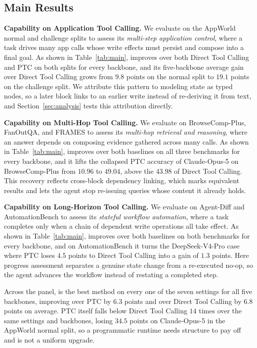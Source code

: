\subsection{Main Results}

\textbf{Capability on Application Tool Calling.}\quad
We evaluate \method on the AppWorld normal and challenge splits to assess its \emph{multi-step application control}, where a task drives many app calls whose write effects must persist and compose into a final goal.
As shown in Table~\ref{tab:main}, \method improves over both Direct Tool Calling and PTC on both splits for every backbone, and its five-backbone average gain over Direct Tool Calling grows from $9.8$ points on the normal split to $19.1$ points on the challenge split.
We attribute this pattern to modeling state as typed nodes, so a later block links to an earlier write instead of re-deriving it from text, and Section~\ref{sec:analysis} tests this attribution directly.

\textbf{Capability on Multi-Hop Tool Calling.}\quad
We evaluate \method on BrowseComp-Plus, FanOutQA, and FRAMES to assess its \emph{multi-hop retrieval and reasoning}, where an answer depends on composing evidence gathered across many calls.
As shown in Table~\ref{tab:main}, \method improves over both baselines on all three benchmarks for every backbone, and it lifts the collapsed PTC accuracy of Claude-Opus-5 on BrowseComp-Plus from $10.96$ to $49.04$, above the $43.98$ of Direct Tool Calling.
This recovery reflects cross-block dependency linking, which marks equivalent results and lets the agent stop re-issuing queries whose content it already holds.

\textbf{Capability on Long-Horizon Tool Calling.}\quad
We evaluate \method on Agent-Diff and AutomationBench to assess its \emph{stateful workflow automation}, where a task completes only when a chain of dependent write operations all take effect.
As shown in Table~\ref{tab:main}, \method improves over both baselines on both benchmarks for every backbone, and on AutomationBench it turns the DeepSeek-V4-Pro case where PTC loses $4.5$ points to Direct Tool Calling into a gain of $1.3$ points.
Here progress assessment separates a genuine state change from a re-executed no-op, so the agent advances the workflow instead of restating a completed step.

Across the panel, \method is the best method on every one of the seven settings for all five backbones, improving over PTC by $6.3$ points and over Direct Tool Calling by $6.8$ points on average.
PTC itself falls below Direct Tool Calling $14$ times over the same settings and backbones, losing $34.5$ points on Claude-Opus-5 in the AppWorld normal split, so a programmatic runtime needs structure to pay off and is not a uniform upgrade.
